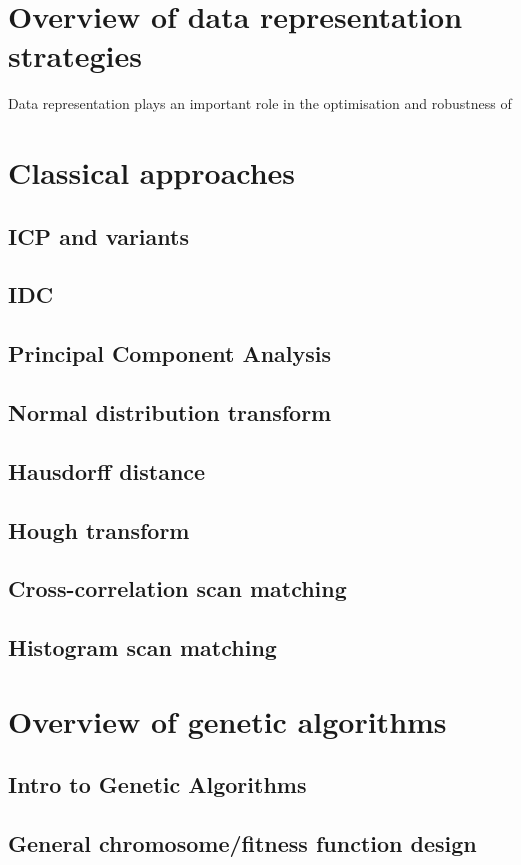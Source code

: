 \documentclass[authoryearcitations]{UoYCSproject}
\begin{document}
\section{Overview of data representation strategies}
Data representation plays an important role in the optimisation and robustness of 


\section{Classical approaches}
\subsection{ICP and variants}
\subsection{IDC}
\subsection{Principal Component Analysis}
\subsection{Normal distribution transform}
\subsection{Hausdorff distance}
\subsection{Hough transform}
\subsection{Cross-correlation scan matching}
\subsection{Histogram scan matching}

\section{Overview of genetic algorithms}
\subsection{Intro to Genetic Algorithms}
\subsection{General chromosome/fitness function design}
\end{document}

